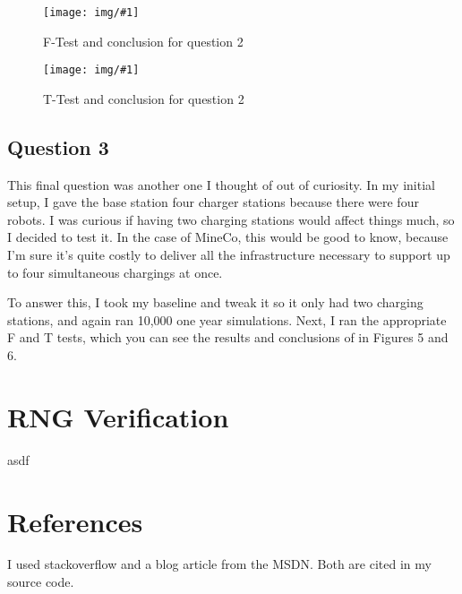 \documentclass{article}
\newcommand{\img}[2]{
	\begin{figure}[ht!]
		\texttt{[image: img/\#1]}
		\centering
		\caption{#2}
	\end{figure}
}
\begin{document}
\img{q2F.png}{F-Test and conclusion for question 2}
\img{q2T.png}{T-Test and conclusion for question 2}

\subsection{Question 3}
This final question was another one I thought of out of curiosity.
In my initial setup, I gave the base station four charger stations because there were four robots.
I was curious if having two charging stations would affect things much, so I decided to test it.
In the case of MineCo, this would be good to know, because I'm sure it's quite costly to deliver all the infrastructure necessary to support up to four simultaneous chargings at once.

To answer this, I took my baseline and tweak it so it only had two charging stations, and again ran 10,000 one year simulations. Next, I ran the appropriate F and T tests, which you can see the results and conclusions of in Figures 5 and 6.

\section{RNG Verification}
asdf
\section{References}
I used stackoverflow and a blog article from the MSDN. Both are cited in my source code.
\end{document}
